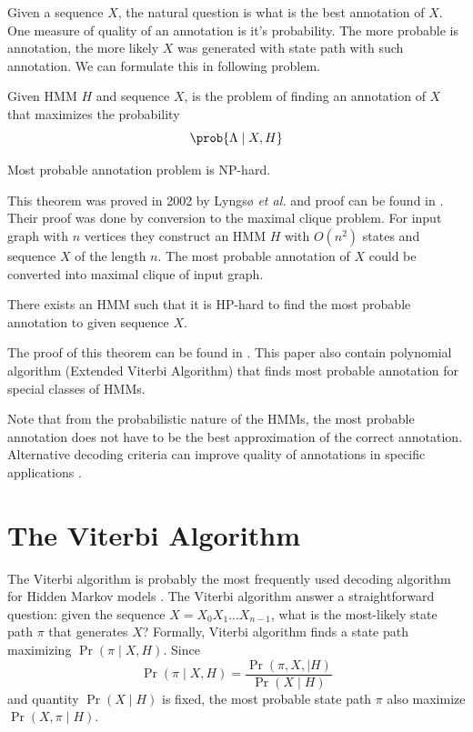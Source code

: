 Given a sequence $X$, the natural question is what is the best annotation of
$X$.  One measure of quality of an annotation is it's probability. The more
probable is annotation, the more likely $X$ was generated with state path with
such annotation. We can formulate this in following problem.

\begin{definition}
Given HMM $H$ and sequence $X$,  is the problem of finding an annotation of $X$ that maximizes
the probability \[\prob{\Lambda\mid X,H}\]
\end{definition}

\begin{theorem}
Most probable annotation problem is NP-hard.
\end{theorem}
This theorem was proved in 2002 by Lyngsø {\it et al.} and proof can be found in
\cite{Lyngso2002}. Their proof was done by conversion to the maximal clique problem.
For input graph with $n$ vertices they construct an HMM $H$ with $O(n^2)$ states and
sequence $X$ of the length $n$. The most probable annotation of $X$ could be
converted into maximal clique of input graph. 

\begin{theorem}
There exists an HMM such that it is HP-hard to find the most probable annotation
to given sequence $X$.
\end{theorem}
The proof of this theorem can be found in \cite{Brejova2007mpa}. This paper also
contain polynomial algorithm (Extended Viterbi Algorithm) that finds most
probable annotation for special classes of HMMs. 

Note that from the probabilistic nature of the HMMs, the most probable
annotation does not have to be the best approximation of the correct annotation.
Alternative decoding criteria can improve quality of annotations in specific
applications \cite{Brown2010,Gross2007,Nanasi2010,Truszkowski2011}.

\section{The Viterbi Algorithm}
The Viterbi algorithm  is probably the most frequently used
decoding algorithm for Hidden Markov
models \cite{Durbin1998}.
The Viterbi algorithm answer a straightforward question: given the sequence
$X=X_0X_1\dots X_{n-1}$, what
is the most-likely state path $\pi$ that generates $X$? Formally, Viterbi
algorithm finds a state path maximizing $\Pr\left( \pi\mid X,H \right)$. Since
\[\Pr\left(\pi\mid X,H\right) = \frac{\Pr\left(\pi,X,\mid
H\right)}{\Pr\left(X\mid H\right)}\] and quantity $\Pr\left(X\mid H\right)$ is
fixed, the most probable state path $\pi$ also maximize $\Pr\left(X,\pi\mid H\right)$. 

